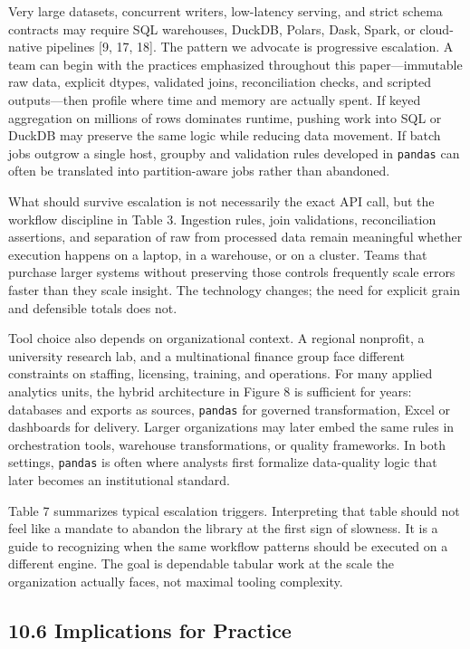 \documentclass[
  12pt,
]{article}
\begin{document}
Very large datasets, concurrent writers, low-latency serving, and strict
schema contracts may require SQL warehouses, DuckDB, Polars, Dask,
Spark, or cloud-native pipelines {[}9, 17, 18{]}. The pattern we
advocate is progressive escalation. A team can begin with the practices
emphasized throughout this paper---immutable raw data, explicit dtypes,
validated joins, reconciliation checks, and scripted outputs---then
profile where time and memory are actually spent. If keyed aggregation
on millions of rows dominates runtime, pushing work into SQL or DuckDB
may preserve the same logic while reducing data movement. If batch jobs
outgrow a single host, groupby and validation rules developed in
\texttt{pandas} can often be translated into partition-aware jobs rather
than abandoned.

What should survive escalation is not necessarily the exact API call,
but the workflow discipline in Table 3. Ingestion rules, join
validations, reconciliation assertions, and separation of raw from
processed data remain meaningful whether execution happens on a laptop,
in a warehouse, or on a cluster. Teams that purchase larger systems
without preserving those controls frequently scale errors faster than
they scale insight. The technology changes; the need for explicit grain
and defensible totals does not.

Tool choice also depends on organizational context. A regional
nonprofit, a university research lab, and a multinational finance group
face different constraints on staffing, licensing, training, and
operations. For many applied analytics units, the hybrid architecture in
Figure 8 is sufficient for years: databases and exports as sources,
\texttt{pandas} for governed transformation, Excel or dashboards for
delivery. Larger organizations may later embed the same rules in
orchestration tools, warehouse transformations, or quality frameworks.
In both settings, \texttt{pandas} is often where analysts first
formalize data-quality logic that later becomes an institutional
standard.

Table 7 summarizes typical escalation triggers. Interpreting that table
should not feel like a mandate to abandon the library at the first sign
of slowness. It is a guide to recognizing when the same workflow
patterns should be executed on a different engine. The goal is
dependable tabular work at the scale the organization actually faces,
not maximal tooling complexity.

\subsection{10.6 Implications for
Practice}\label{implications-for-practice}
\end{document}
